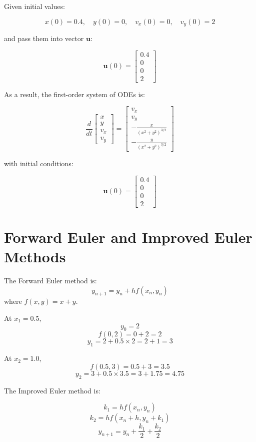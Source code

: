 \documentclass{article}
\begin{document}
Given initial values:

$$
    x(0) = 0.4, \quad y(0) = 0, \quad v_x(0) = 0, \quad v_y(0) = 2
$$

and pass them into vector $\mathbf{u}$:

$$
    \mathbf{u}(0) = \begin{bmatrix} 0.4 \\ 0 \\ 0 \\ 2 \end{bmatrix}
$$

As a result, the first-order system of ODEs is:

$$
    \frac{d}{dt} \begin{bmatrix} x \\ y \\ v_x \\ v_y \end{bmatrix} =
    \begin{bmatrix}
        v_x                           \\
        v_y                           \\
        - \frac{x}{(x^2 + y^2)^{3/2}} \\
        - \frac{y}{(x^2 + y^2)^{3/2}}
    \end{bmatrix}
$$

with initial conditions:

$$
    \mathbf{u}(0) = \begin{bmatrix} 0.4 \\ 0 \\ 0 \\ 2 \end{bmatrix}
$$

\newpage
\section{Forward Euler and Improved Euler Methods}
The Forward Euler method is:
$$
    y_{n+1} = y_n + h f(x_n, y_n)
$$
where \( f(x, y) = x + y \).

At \( x_1 = 0.5 \),
$$ y_0 = 2 $$
$$ f(0,2) = 0 + 2 = 2 $$
$$
    y_1 = 2 + 0.5 \times 2 = 2 + 1 = 3
$$

At \( x_2 = 1.0 \),
$$ f(0.5, 3) = 0.5 + 3 = 3.5 $$
$$
    y_2 = 3 + 0.5 \times 3.5 = 3 + 1.75 = 4.75
$$

The Improved Euler method is:

$$
    k_1 = hf(x_n, y_n)
$$
$$
    k_2 = hf(x_n + h, y_n + k_1)
$$
$$
    y_{n+1} = y_n + \frac{k_1}{2} + \frac{k_2}{2}
$$
\end{document}
